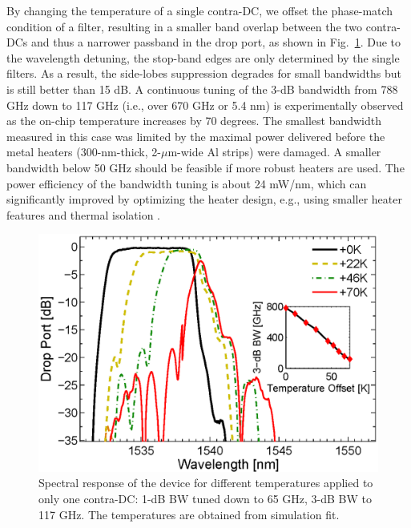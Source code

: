\documentclass[osajnl,twocolumn,showpacs,superscriptaddress,10pt]{revtex4-1}
\begin{document}
By changing the temperature of a single contra-DC, we offset the phase-match condition of a filter, resulting in a smaller band overlap between the two contra-DCs and thus a narrower passband in the drop port, as shown in Fig.~\ref{fig:bandTune}.  
Due to the wavelength detuning,  the stop-band edges are only determined by the single filters. 
As a result, the side-lobes suppression degrades  for small bandwidths but is still better than 15 dB. A continuous tuning of the 3-dB bandwidth from 788 GHz down to 117 GHz (i.e., over 670 GHz or 5.4 nm) is experimentally observed as the on-chip temperature increases by 70 degrees. 
The smallest bandwidth measured in this case was limited by the maximal power delivered before the metal heaters (300-nm-thick, 2-$\mu$m-wide Al strips) were damaged. A smaller bandwidth below 50 GHz should be feasible if more robust heaters are used.
The power efficiency of the bandwidth tuning is about 24 mW/nm, which can significantly improved by optimizing the heater design, e.g., using smaller heater features and thermal isolation \cite{dong2010thermally}.

\begin{figure}[htbp]
\centering
\includegraphics[width=.99\columnwidth]{data/Band6}
\caption{Spectral response of the device for different temperatures applied to only one contra-DC: 1-dB BW tuned down to 65 GHz, 3-dB BW to 117 GHz. The temperatures are obtained from simulation fit.}
\label{fig:bandTune}
\end{figure} 
\end{document}
